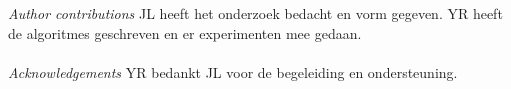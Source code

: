 \textit{Author contributions}
JL heeft het onderzoek bedacht en vorm gegeven.
YR heeft de algoritmes geschreven en er experimenten mee gedaan. \\ \\
\textit{Acknowledgements} 
YR bedankt JL voor de begeleiding en ondersteuning. 
\newpage